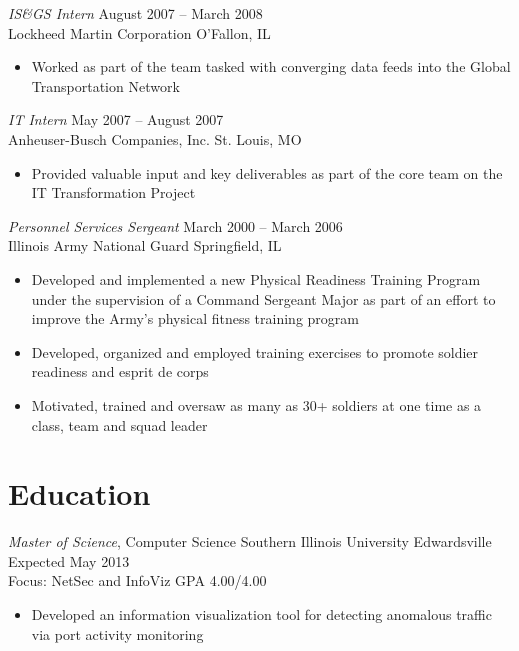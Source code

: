 \documentclass[margin,line]{resume}
\begin{document}
\begin{resume}
\begin{itemize}
\end{itemize}

{\sl IS\&GS Intern}                 \hfill  August 2007 -- March 2008\\
Lockheed Martin Corporation         \hfill  O'Fallon, IL
\begin{itemize} \itemsep -2pt %
\small\item Worked as part of the team tasked with converging data feeds into the Global Transportation Network
\end{itemize}

{\sl IT Intern}                     \hfill  May 2007 -- August 2007\\
Anheuser-Busch Companies, Inc.      \hfill  St. Louis, MO
\begin{itemize} \itemsep -2pt %
\small\item Provided valuable input and key deliverables as part of the core team on the IT Transformation Project
\end{itemize}

{\sl Personnel Services Sergeant}   \hfill   March 2000 -- March 2006\\
Illinois Army National Guard        \hfill   Springfield, IL
\begin{itemize} \itemsep -2pt %
\small\item Developed and implemented a new Physical Readiness Training Program under the supervision of a
            Command Sergeant Major as part of an effort to improve the Army's physical fitness training program
\small\item Developed, organized and employed training exercises to promote soldier readiness and esprit de corps
\small\item Motivated, trained and oversaw as many as 30+ soldiers at one time as a class, team and squad leader
\end{itemize}

\section{Education}
{\small
  {\sl Master of Science}, Computer Science \hfill
  Southern Illinois University Edwardsville \hfill
  Expected May 2013\\
  Focus: NetSec and InfoViz \hfill
  GPA 4.00/4.00
}
\begin{itemize} \itemsep -2pt %
\small\item[] Developed an information visualization tool for detecting anomalous traffic via port activity monitoring
\end{itemize}


\end{resume}
\end{document}
